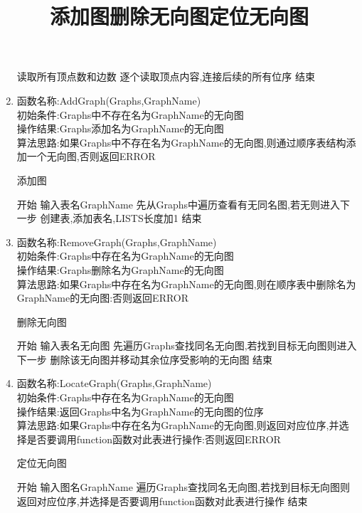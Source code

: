\documentclass[supercite]{HustGraduPaper}
\theoremstyle{definition}
\begin{document}
\begin{enumerate}
\begin{algorithm}[htb]
\begin{algorithmic}[1]
			      \State 读取所有顶点数和边数
			      \State 逐个读取顶点内容,连接后续的所有位序
			      \State 结束
		      \end{algorithmic}\label{G17}
	      \end{algorithm}
	\item 函数名称:AddGraph(Graphs,GraphName)\\
	      初始条件:Graphs中不存在名为GraphName的无向图\\
	      操作结果:Graphs添加名为GraphName的无向图\\
	      算法思路:如果Graphs中不存在名为GraphName的无向图,则通过顺序表结构添加一个无向图,否则返回ERROR
	      \begin{algorithm}[htb]
		      \title{添加图}
		      \caption{添加图}
		      \begin{algorithmic}[1]
			      \State 开始
			      \State 输入表名GraphName
			      \State 先从Graphs中遍历查看有无同名图,若无则进入下一步
			      \State 创建表,添加表名,LISTS长度加1
			      \State 结束
		      \end{algorithmic}\label{G18}
	      \end{algorithm}
	\item 函数名称:RemoveGraph(Graphs,GraphName)\\
	      初始条件:Graphs中存在名为GraphName的无向图\\
	      操作结果:Graphs删除名为GraphName的无向图\\
	      算法思路:如果Graphs中存在名为GraphName的无向图,则在顺序表中删除名为GraphName的无向图:否则返回ERROR
	      \begin{algorithm}[htb]
		      \title{删除无向图}
		      \caption{删除无向图}
		      \begin{algorithmic}[1]
			      \State 开始
			      \State 输入表名无向图
			      \State 先遍历Graphs查找同名无向图,若找到目标无向图则进入下一步
			      \State 删除该无向图并移动其余位序受影响的无向图
			      \State 结束
		      \end{algorithmic}\label{G19}
	      \end{algorithm}
	      \newpage
	\item 函数名称:LocateGraph(Graphs,GraphName)\\
	      初始条件:Graphs中存在名为GraphName的无向图\\
	      操作结果:返回Graphs中名为GraphName的无向图的位序\\
	      算法思路:如果Graphs中存在名为GraphName的无向图,则返回对应位序,并选择是否要调用function函数对此表进行操作:否则返回ERROR
	      \begin{algorithm}[htb]
		      \title{定位无向图}
		      \caption{定位无向图}
		      \begin{algorithmic}[1]
			      \State 开始
			      \State 输入图名GraphName
			      \State 遍历Graphs查找同名无向图,若找到目标无向图则返回对应位序,并选择是否要调用function函数对此表进行操作
			      \State 结束
		      \end{algorithmic}\label{G20}
	      \end{algorithm}
\end{enumerate}
\newpage
\end{document}
